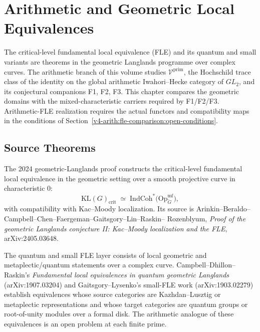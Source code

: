 \chapter{Arithmetic and Geometric Local Equivalences}
\label{v4-arith:fle-comparison}

The critical-level fundamental local equivalence (FLE) and its quantum
and small variants are theorems in the geometric Langlands programme
over complex curves. The arithmetic branch of this volume studies
\(\mathcal{V}^{\mathrm{prim}}\), the Hochschild trace class of the
identity on the global arithmetic Iwahori--Hecke category of
\(GL_{2}\), and its conjectural companions F1, F2, F3. This chapter
compares the geometric domains with the mixed-characteristic
carriers required by F1/F2/F3. Arithmetic-FLE realization requires
the actual functors and compatibility maps in the conditions of Section~\ref{v4-arith:fle-comparison:open-conditions}.

\section{Source Theorems}
\label{v4-arith:fle-comparison:sources}

\begin{theorem}
\label{v4-arith:fle-comparison:thm:critical-FLE-source}
The 2024 geometric-Langlands proof
constructs the critical-level fundamental local equivalence in the
geometric setting over a smooth projective curve in characteristic
\(0\):
\[
\mathrm{KL}(G)_{\mathrm{crit}}\;\simeq\;
\mathrm{IndCoh}^{*}\bigl(\mathrm{Op}^{\mathrm{mf}}_{\check G}\bigr),
\]
with compatibility with Kac--Moody localization. Its source is
Arinkin--Beraldo--Campbell--Chen--Faergeman--Gaitsgory--Lin--Raskin--
Rozenblyum, \emph{Proof of the geometric Langlands conjecture II:
Kac--Moody localization and the FLE}, arXiv:2405.03648.
\end{theorem}

\begin{theorem}
\label{v4-arith:fle-comparison:thm:quantum-FLE-source}
The quantum and small FLE layer consists
of local geometric and metaplectic/quantum statements over a complex
curve. Campbell--Dhillon--Raskin's \emph{Fundamental local
equivalences in quantum geometric Langlands} (arXiv:1907.03204) and
Gaitsgory--Lysenko's small-FLE work (arXiv:1903.02279) establish
equivalences whose source categories are Kazhdan--Lusztig or
metaplectic representations and whose target categories are quantum
groups or root-of-unity modules over a formal disk. The arithmetic
analogue of these equivalences is an open problem at each finite prime.
\end{theorem}

